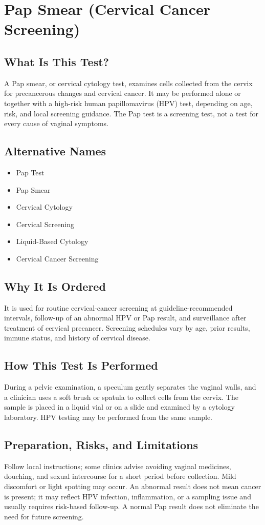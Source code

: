 \chapter{Pap Smear (Cervical Cancer Screening)}

\section*{What Is This Test?}
A Pap smear, or cervical cytology test, examines cells collected from the cervix for precancerous changes and cervical cancer. It may be performed alone or together with a high-risk human papillomavirus (HPV) test, depending on age, risk, and local screening guidance. The Pap test is a screening test, not a test for every cause of vaginal symptoms.

\section*{Alternative Names}
\begin{itemize}
  \item Pap Test
  \item Pap Smear
  \item Cervical Cytology
  \item Cervical Screening
  \item Liquid-Based Cytology
  \item Cervical Cancer Screening
\end{itemize}
\section*{Why It Is Ordered}
It is used for routine cervical-cancer screening at guideline-recommended intervals, follow-up of an abnormal HPV or Pap result, and surveillance after treatment of cervical precancer. Screening schedules vary by age, prior results, immune status, and history of cervical disease.

\section*{How This Test Is Performed}
During a pelvic examination, a speculum gently separates the vaginal walls, and a clinician uses a soft brush or spatula to collect cells from the cervix. The sample is placed in a liquid vial or on a slide and examined by a cytology laboratory. HPV testing may be performed from the same sample.

\section*{Preparation, Risks, and Limitations}
Follow local instructions; some clinics advise avoiding vaginal medicines, douching, and sexual intercourse for a short period before collection. Mild discomfort or light spotting may occur. An abnormal result does not mean cancer is present; it may reflect HPV infection, inflammation, or a sampling issue and usually requires risk-based follow-up. A normal Pap result does not eliminate the need for future screening.

